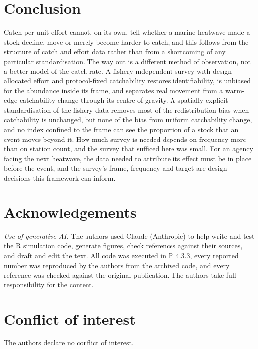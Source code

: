 \documentclass[11pt,a4paper]{article}
\begin{document}
\section{Conclusion}

Catch per unit effort cannot, on its own, tell whether a marine heatwave made a stock decline, move or merely become harder to catch, and this follows from the structure of catch and effort data rather than from a shortcoming of any particular standardisation. The way out is a different method of observation, not a better model of the catch rate. A fishery-independent survey with design-allocated effort and protocol-fixed catchability restores identifiability, is unbiased for the abundance inside its frame, and separates real movement from a warm-edge catchability change through its centre of gravity. A spatially explicit standardisation of the fishery data removes most of the redistribution bias when catchability is unchanged, but none of the bias from uniform catchability change, and no index confined to the frame can see the proportion of a stock that an event moves beyond it. How much survey is needed depends on frequency more than on station count, and the survey that sufficed here was small. For an agency facing the next heatwave, the data needed to attribute its effect must be in place before the event, and the survey's frame, frequency and target are design decisions this framework can inform.

\section*{Acknowledgements}

\noindent\textit{Use of generative AI.} The authors used Claude (Anthropic) to help write and test the R simulation code, generate figures, check references against their sources, and draft and edit the text. All code was executed in R 4.3.3, every reported number was reproduced by the authors from the archived code, and every reference was checked against the original publication. The authors take full responsibility for the content.

\section*{Conflict of interest}
The authors declare no conflict of interest.
\end{document}
